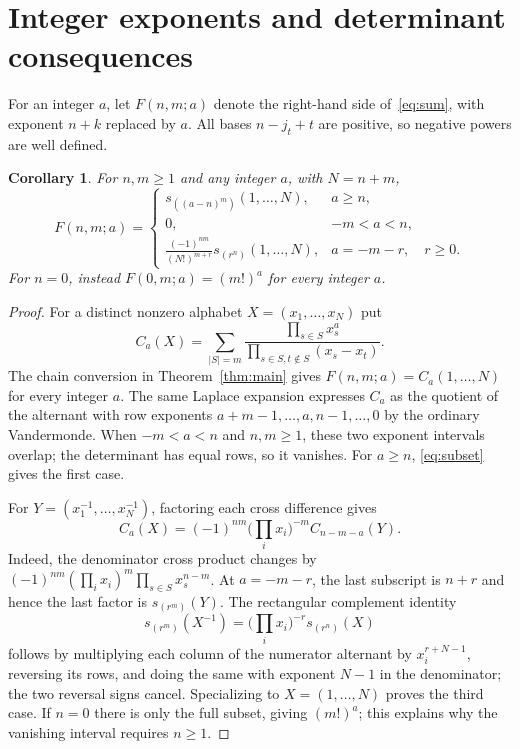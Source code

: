 \documentclass[11pt]{article}
\newtheorem{corollary}[theorem]{Corollary}
\newcommand{\Schur}{s}
\begin{document}
\section{Integer exponents and determinant consequences}
For an integer $a$, let $F(n,m;a)$ denote the right-hand side
of~\eqref{eq:sum}, with exponent $n+k$ replaced by $a$.
All bases $n-j_t+t$ are positive, so negative powers are well defined.

\begin{corollary}\label{cor:integer}
For $n,m\geq1$ and any integer $a$, with $N=n+m$,
\begin{equation}\label{eq:integer}
F(n,m;a)=
\begin{cases}
\Schur_{((a-n)^m)}(1,\ldots,N),&a\geq n,\\
0,&-m<a<n,\\
\displaystyle\frac{(-1)^{nm}}{(N!)^{m+r}}
\Schur_{(r^n)}(1,\ldots,N),&a=-m-r,\quad r\geq0.
\end{cases}
\end{equation}
For $n=0$, instead $F(0,m;a)=(m!)^a$ for every integer $a$.
\end{corollary}
\begin{proof}
For a distinct nonzero alphabet $X=(x_1,\ldots,x_N)$ put
\[
C_a(X)=\sum_{|S|=m}
\frac{\prod_{s\in S}x_s^a}{\prod_{s\in S,t\notin S}(x_s-x_t)}.
\]
The chain conversion in Theorem~\ref{thm:main} gives
$F(n,m;a)=C_a(1,\ldots,N)$ for every integer $a$.
The same Laplace expansion expresses $C_a$ as the quotient of the alternant
with row exponents $a+m-1,\ldots,a,n-1,\ldots,0$ by the ordinary Vandermonde.
When $-m<a<n$ and $n,m\geq1$, these two exponent intervals overlap;
the determinant has equal rows, so it vanishes. For $a\geq n$,
\eqref{eq:subset} gives the first case.

For $Y=(x_1^{-1},\ldots,x_N^{-1})$, factoring each cross difference gives
\[
C_a(X)=(-1)^{nm}\Big(\prod_i x_i\Big)^{-m}C_{n-m-a}(Y).
\]
Indeed, the denominator cross product changes by
$(-1)^{nm}(\prod_i x_i)^m\prod_{s\in S}x_s^{n-m}$.
At $a=-m-r$, the last subscript is $n+r$ and hence the last factor is
$\Schur_{(r^m)}(Y)$.
The rectangular complement identity
\[
\Schur_{(r^m)}(X^{-1})
 =\Big(\prod_i x_i\Big)^{-r}\Schur_{(r^n)}(X)
\]
follows by multiplying each column of the numerator alternant by
$x_i^{r+N-1}$, reversing its rows, and doing the same with exponent $N-1$
in the denominator; the two reversal signs cancel.
Specializing to $X=(1,\ldots,N)$ proves the third case.
If $n=0$ there is only the full subset, giving $(m!)^a$;
this explains why the vanishing interval requires $n\geq1$.
\end{proof}
\end{document}
